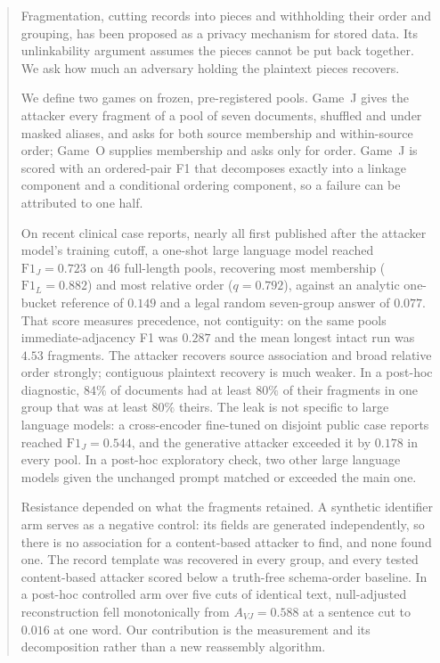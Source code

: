 \documentclass[sigconf,review]{acmart}
\newcommand{\FJ}{\ensuremath{\mathrm{F1}_{J}}}
\newcommand{\FL}{\ensuremath{\mathrm{F1}_{L}}}
\newcommand{\AVJ}{\ensuremath{A_{VJ}}}
\begin{document}
\begin{abstract}
Fragmentation, cutting records into pieces and withholding their order and
grouping, has been proposed as a privacy mechanism for stored data. Its
unlinkability argument assumes the pieces cannot be put back together. We ask
how much an adversary holding the plaintext pieces recovers.

We define two games on frozen, pre-registered pools. Game~J gives the attacker
every fragment of a pool of seven documents, shuffled and under masked
aliases, and asks for both source membership and within-source order; Game~O
supplies membership and asks only for order. Game~J is scored with an
ordered-pair F1 that decomposes exactly into a linkage component and a
conditional ordering component, so a failure can be attributed to one half.

On recent clinical case reports, nearly all first published after the
attacker model's training cutoff, a one-shot large language model reached
$\FJ = 0.723$ on 46 full-length pools,
recovering most membership ($\FL = 0.882$) and most relative order
($q = 0.792$), against an analytic one-bucket reference of $0.149$ and a legal
random seven-group answer of $0.077$. That score measures precedence, not
contiguity: on the same pools immediate-adjacency F1 was $0.287$ and the mean
longest intact run was $4.53$ fragments. The attacker recovers source
association and broad relative order strongly; contiguous plaintext recovery
is much weaker. In a post-hoc diagnostic, $84\%$ of documents had at least
$80\%$ of their fragments in one group that was at least $80\%$ theirs. The
leak is not specific to large language models: a
cross-encoder fine-tuned on disjoint public case reports reached
$\FJ = 0.544$, and the generative attacker exceeded it by $0.178$ in every
pool. In a post-hoc exploratory check, two other large language models given the unchanged
prompt matched or exceeded the main one.

Resistance depended on what the fragments retained. A synthetic identifier
arm serves as a negative control: its fields are generated independently, so
there is no association for a content-based attacker to find, and none found
one. The record template was recovered in every group, and every tested
content-based attacker scored below a truth-free schema-order baseline. In a
post-hoc controlled arm over five cuts of identical text, null-adjusted
reconstruction fell monotonically from $\AVJ = 0.588$ at a sentence cut to
$0.016$ at one word. Our contribution is the measurement and its
decomposition rather than a new reassembly algorithm.
\end{abstract}
\end{document}
